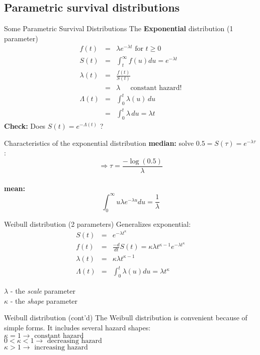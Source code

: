 \documentclass[envcountsect, 10pt, portrait, palatino]{beamer}
\begin{document}
\subsection{Parametric survival distributions}
\begin{frame}{Some Parametric Survival Distributions}
The {\bf Exponential} distribution  (1 parameter)
\begin{eqnarray*}
f(t) & = & \lambda e^{-\lambda t} \mbox{ for } t\ge 0 \\[2ex]
S(t) & = & \int_t^\infty f(u) du  =  e^{-\lambda t} \\[2ex]
\lambda(t) & = & \frac{f(t)}{S(t)} \\
& = & \lambda ~~~~~\mbox{ constant hazard!} \\[2ex]
\Lambda(t) & = & \int_0^t \lambda(u) \, du \\[1ex]
 & = & \int_0^t \lambda \, du = \lambda t
\end{eqnarray*}
{\bf Check:} Does $S(t)=e^{-\Lambda(t)}$ ? \\[2ex]
\end{frame}
\begin{frame}{Characteristics of the exponential distribution}
{\bf median:} solve $0.5=S(\tau)=e^{-\lambda \tau}$:
\[\Rightarrow \tau=\frac{-\log(0.5)}{\lambda}\]
\\[2ex]
{\bf mean:}
\[\int_0^\infty u\lambda e^{-\lambda u}du=\frac{1}{\lambda}\]
\end{frame}
\begin{frame}{Weibull distribution (2 parameters)}
Generalizes exponential:
\begin{eqnarray*}
S(t) & = & e^{-\lambda t^\kappa} \\[2ex]
f(t) & = & \frac{-d}{dt}S(t)=\kappa \lambda t^{\kappa-1}
e^{-\lambda t^\kappa}\\[2ex]
\lambda(t) & = & \kappa \lambda t^{\kappa-1}\\[2ex]
\Lambda(t) & = & \int_0^t\lambda(u) du = \lambda t^\kappa
\end{eqnarray*}

$\lambda$ -  the {\em scale} parameter\\
$\kappa$  - the {\em shape} parameter
\end{frame}
\begin{frame}{Weibull distribution (cont'd)}
The Weibull distribution is convenient because of simple
forms.  It includes several hazard shapes:\\[2ex]
$\kappa=1 \rightarrow \mbox{ constant hazard}$ \\[1ex]
$0<\kappa<1 \rightarrow \mbox{ decreasing hazard}$ \\[1ex]
$\kappa > 1 \rightarrow \mbox{ increasing hazard}$

\end{frame}
\end{document}
